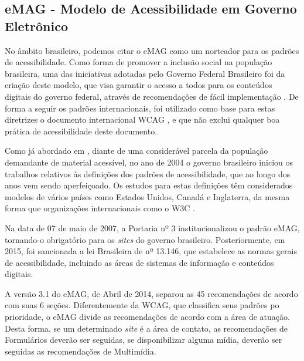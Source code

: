 \subsection{eMAG - Modelo de Acessibilidade em Governo Eletrônico \cite{emag}}
No âmbito brasileiro, podemos citar o eMAG como um norteador para os padrões de acessibilidade. Como forma de promover a inclusão social na população brasileira, uma das iniciativas adotadas pelo Governo Federal Brasileiro foi da criação deste modelo, que visa garantir o acesso a todos para os conteúdos digitais do governo federal, através de recomendações de fácil implementação \cite{victormaster}.
De forma a seguir os padrões internacionais, foi utilizado como base para estas diretrizes o documento internacional WCAG \cite{wcag}, e que não exclui qualquer boa prática de acessibilidade deste documento.

Como já abordado em \cite{victormaster}, diante de uma considerável parcela da população demandante de material acessível, no ano de 2004 o governo brasileiro iniciou os trabalhos relativos às definições dos padrões de acessibilidade, que ao longo dos anos vem sendo aperfeiçoado. Os estudos para estas definições têm considerados modelos de vários países como Estados Unidos, Canadá e Inglaterra, da mesma forma que organizações internacionais como o W3C \cite{wai}.

Na data de 07 de maio de 2007, a Portaria nº 3 institucionalizou o padrão eMAG, tornando-o obrigatório para os \textit{sites} do governo brasileiro. Posteriormente, em 2015, foi sancionada a lei Brasileira de nº 13.146, que estabelece as normas gerais de acessibilidade, incluindo as áreas de sistemas de informação e conteúdos digitais.

A versão 3.1 do eMAG, de Abril de 2014, separou as 45 recomendações de acordo com suas 6 seções. Diferentemente da WCAG, que classifica seus padrões po prioridade, o eMAG divide as recomendações de acordo com a área de atuação. Desta forma, se um determinado \textit{site} é a área de contato, as recomendações de Formulários deverão ser seguidas, se disponibilizar alguma mídia, deverão ser seguidas as recomendações de Multimídia.

